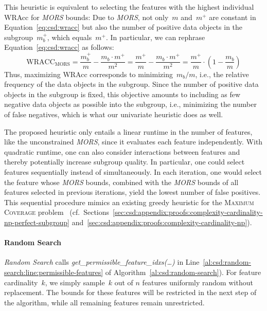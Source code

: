 \documentclass{article}
\theoremstyle{definition}
\begin{document}
This heuristic is equivalent to selecting the features with the highest individual WRAcc for \emph{MORS} bounds:
Due to \emph{MORS}, not only~$m$ and~$m^+$ are constant in Equation~\ref{eq:csd:wracc} but also the number of positive data objects in the subgroup~$m_b^+$, which equals~$m^+$.
In particular, we can rephrase Equation~\ref{eq:csd:wracc} as follows:
%
\begin{equation}
	\text{WRACC}_{\text{MORS}} = \frac{m_b^+}{m} - \frac{m_b \cdot m^+}{m^2} = \frac{m^+}{m} - \frac{m_b \cdot m^+}{m^2} = \frac{m^+}{m} \cdot \left( 1 - \frac{m_b}{m} \right)
	\label{eq:csd:wracc-mors}
\end{equation}
%
Thus, maximizing WRAcc corresponds to minimizing~$m_b / m$, i.e., the relative frequency of the data objects in the subgroup.
Since the number of positive data objects in the subgroup is fixed, this objective amounts to including as few negative data objects as possible into the subgroup, i.e., minimizing the number of false negatives, which is what our univariate heuristic does as well.

The proposed heuristic only entails a linear runtime in the number of features, like the unconstrained \emph{MORS}, since it evaluates each feature independently.
With quadratic runtime, one can also consider interactions between features and thereby potentially increase subgroup quality.
In particular, one could select features sequentially instead of simultaneously.
In each iteration, one would select the feature whose \emph{MORS} bounds, combined with the \emph{MORS} bounds of all features selected in previous iterations, yield the lowest number of false positives.
This sequential procedure mimics an existing greedy heuristic for the \textsc{Maximum Coverage} problem~\cite{chekuri2004maximum} (cf.~Sections~\ref{sec:csd:appendix:proofs:complexity-cardinality-np-perfect-subgroup} and~\ref{sec:csd:appendix:proofs:complexity-cardinality-np}).

\paragraph{Random Search}

\emph{Random Search} calls \emph{get\_permissible\_feature\_idxs(\dots)} in Line~\ref{al:csd:random-search:line:permissible-features} of Algorithm~\ref{al:csd:random-search}).
For feature cardinality~$k$, we simply sample~$k$ out of $n$ features uniformly random without replacement.
The bounds for these features will be restricted in the next step of the algorithm, while all remaining features remain unrestricted.
\end{document}
